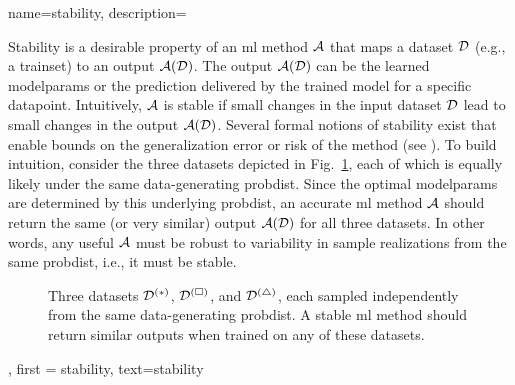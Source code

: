 {name={stability},
	description={
		Stability is a desirable property of an \gls{ml} method $\mathcal{A}$ that maps a 
		\gls{dataset} $\mathcal{D}$ (e.g., a \gls{trainset}) to an output $\mathcal{A}(\mathcal{D})$. The output 
		$\mathcal{A}(\mathcal{D})$ can be the learned \gls{modelparams} or the \gls{prediction} delivered 
		by the trained \gls{model} for a specific \gls{datapoint}. Intuitively, $\mathcal{A}$ is 
		stable if small changes in the input \gls{dataset} $\mathcal{D}$ lead to small changes in the 
		output $\mathcal{A}(\mathcal{D})$. Several formal notions of stability exist that enable bounds 
		on the \gls{generalization} error or \gls{risk} of the method (see \cite[Ch.~13]{ShalevMLBook}).
		To build intuition, consider the three \gls{dataset}s depicted in Fig.~\ref{fig_three_data_stability}, each 
		of which is equally likely under the same \gls{data}-generating \gls{probdist}. Since the 
		optimal \gls{modelparams} are determined by this underlying \gls{probdist}, an accurate 
		\gls{ml} method $\mathcal{A}$ should return the same (or very similar) output $\mathcal{A}(\mathcal{D})$ 
		for all three \gls{dataset}s. In other words, any useful $\mathcal{A}$ must be robust to 
		variability in \gls{sample} \gls{realization}s from the same \gls{probdist}, i.e., it must be stable. 
		\begin{figure}[H]
			\centering
			\caption{Three \gls{dataset}s $\mathcal{D}^{(*)}$, $\mathcal{D}^{(\square)}$, and $\mathcal{D}^{(\triangle)}$, 
				each sampled independently from the same \gls{data}-generating \gls{probdist}. A stable \gls{ml} 
				method should return similar outputs when trained on any of these \gls{dataset}s. \label{fig_three_data_stability}}
		\end{figure}
		}, 
	first = {stability}, text={stability} 
}


